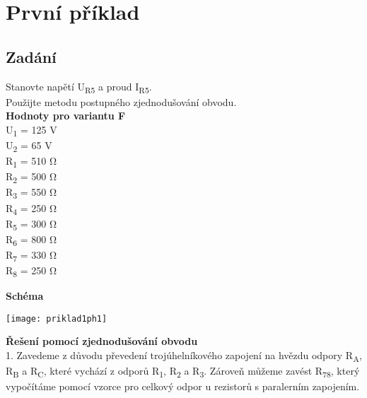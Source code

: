 \documentclass[12pt,a4paper]{article} %
\begin{document}
    	\section{První příklad}
        		\subsection*{Zadání}
		Stanovte napětí U\textsubscript{R5} a proud I\textsubscript{R5}. 
		\\Použijte metodu postupného zjednodušování obvodu.
		\\\textbf{Hodnoty pro variantu F}
		\\ U\textsubscript{1} = 125 V
		\\U\textsubscript{2} = 65 V
		\\R\textsubscript{1} = 510 \si{\ohm}
		\\R\textsubscript{2} = 500 \si{\ohm}
		\\R\textsubscript{3} = 550 \si{\ohm}
		\\R\textsubscript{4} = 250 \si{\ohm}
		\\R\textsubscript{5} = 300 \si{\ohm}
		\\R\textsubscript{6} = 800 \si{\ohm}
		\\R\textsubscript{7} = 330 \si{\ohm}
		\\R\textsubscript{8} = 250 \si{\ohm}
		\bigskip
		
		\textbf{Schéma}
		\medskip

		\centerline{
		\texttt{[image: priklad1ph1]}
		}
		\clearpage
		\textbf{Řešení pomocí zjednodušování obvodu}
		\\1. Zavedeme z důvodu převedení trojúhelníkového zapojení na hvězdu odpory R\textsubscript{A}, R\textsubscript{B} a R\textsubscript{C}, které vychází z odporů R\textsubscript{1}, R\textsubscript{2} a R\textsubscript{3}. Zároveň můžeme zavést R\textsubscript{78}, který vypočítáme pomocí vzorce pro celkový odpor u rezistorů s paralerním zapojením.
		\medskip
		
\end{document}
